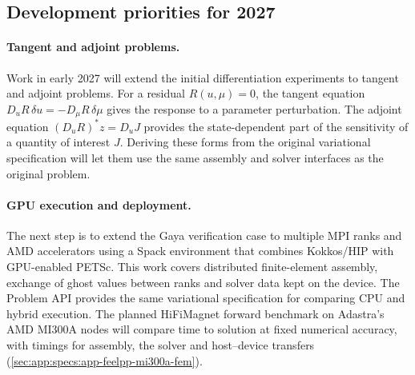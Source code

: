 \subsection{Development priorities for 2027}
\label{sec:Feelpp:problem-api-2027}
\paragraph{Tangent and adjoint problems.}
Work in early 2027 will extend the initial differentiation experiments to
tangent and adjoint problems. For a residual $R(u,\mu)=0$, the tangent
equation $D_uR\,\delta u=-D_\mu R\,\delta\mu$ gives the response to a
parameter perturbation. The adjoint equation $(D_uR)^*z=D_uJ$ provides
the state-dependent part of the sensitivity of a quantity of interest $J$.
Deriving these forms from the original variational specification will let them
use the same assembly and solver interfaces as the original problem.

\paragraph{GPU execution and deployment.}
The next step is to extend the Gaya verification case to multiple MPI
ranks and AMD accelerators using a Spack environment that combines
Kokkos/HIP with GPU-enabled PETSc. This work covers distributed finite-element
assembly, exchange of ghost values between ranks and solver data kept on
the device. The Problem API provides the same variational specification
for comparing CPU and hybrid execution. The planned HiFiMagnet forward
benchmark on Adastra's AMD MI300A nodes will compare time to solution at
fixed numerical accuracy, with timings for assembly, the solver and
host--device transfers (\cref{sec:app:specs:app-feelpp-mi300a-fem}).

